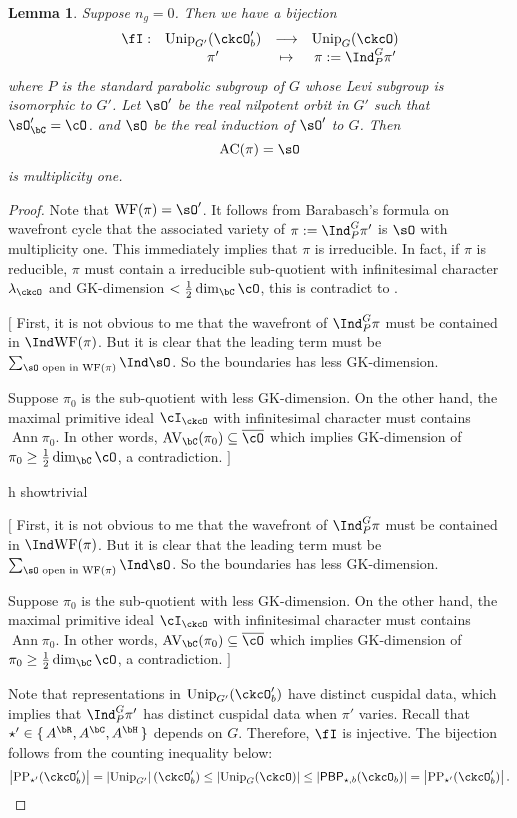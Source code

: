\documentclass[12pt,a4paper]{amsart}
\newcommand{\trivial}[2][]{\if\relax\detokenize{#1}\relax
  {%
      \color{orange} \vspace{0em} $[$  #2 $]$
      \color{black}
  }
  \else
\ifx#1h
\ifcsname showtrivial\endcsname
{%
    \color{orange} \vspace{0em}  $[$ #2 $]$
    \color{black}
}
\fi
\else {\red Wrong argument!} \fi
\fi
}
\newcommand{\AC}{\mathrm{AC}}
\newcommand{\WF}{\mathrm{WF}}
\newcommand{\AV}{\mathrm{AV}}
\def\abs#1{\left|{#1}\right|}
\DeclareMathOperator{\Ann}{Ann}
\numberwithin{equation}{section}
\newtheorem{lem}[thm]{Lemma}
\theoremstyle{remark}
\def\half{{\tfrac{1}{2}}}
\def\Unip{\mathrm{Unip}}
\def\lamck{\lambda_\ckcO}
\def\PP{\mathrm{PP}}
\def\PBP{\mathsf{PBP}}
\begin{document}
\begin{lem}
  Suppose $n_{g}=0$. Then we have a bijection
  \[
    \begin{array}{rccc}
      \fI: &\Unip_{G'}(\ckcO'_{b}) & \longrightarrow & \Unip_{G}(\ckcO) \\
      &\pi' & \mapsto & \pi:=\Ind_{P}^{G}\pi'
    \end{array}
  \]
  where $P$ is the standard parabolic subgroup of $G$ whose Levi subgroup is
  isomorphic to $G'$.
  Let $\sO'$ be the real nilpotent orbit in $G'$ such that $\sO'_{\bC}=\cO$.
  and $\sO$ be the real induction of $\sO'$ to $G$.
  Then
  \[
    \AC(\pi) = \sO
  \]
  is multiplicity one.
\end{lem}
\begin{proof}
  Note that $\WF(\pi)=\sO'$.
  It follows from Barabasch's formula on wavefront cycle that the
  associated variety of $\pi:=\Ind_{P}^{G}\pi'$ is $\sO$ with multiplicity one.
  This immediately implies that $\pi$ is irreducible. In fact, if $\pi$ is
  reducible, $\pi$ must contain a irreducible sub-quotient with infinitesimal
  character $\lambda_{\ckcO}$ and GK-dimension $<\half\dim_{\bC}\cO$, this
  is contradict to .
  \trivial[]{
    First, it is not obvious to me that the wavefront of $\Ind_{P}^{G}\pi$
    must be contained in $\Ind\WF(\pi)$. But it is clear that the leading term
    must be $\sum_{\sO\text{ open in } \WF(\pi)}\Ind\sO$. So the boundaries has
    less GK-dimension.

    Suppose $\pi_{0}$ is the sub-quotient with less GK-dimension.
    On the other hand, the maximal primitive ideal $\cI_{\ckcO}$  with infinitesimal
    character must contains $\Ann\pi_{0}$. In other words,
    $\AV_{\bC}(\pi_{0})\subseteq \bcO$ which implies GK-dimension of
    $\pi_{0}\geq \half\dim_{\bC}\cO$, a contradiction.
  }
  Note that representations in $\Unip_{G'}(\ckcO'_{b})$ have distinct
  cuspidal data, which implies that $\Ind_{P}^{G}\pi'$ has distinct cuspidal
  data when $\pi'$ varies.
  Recall that $\star' \in \set{A^{\bR},A^{\bC}, A^{\bH}}$ depends on $G$.
  Therefore, $\fI$ is injective. The bijection follows from the counting
  inequality below:
  \[
    \abs{\PP_{\star'}(\ckcO'_{b})}=\abs{\Unip_{G'}}(\ckcO'_{b})\leq \abs{\Unip_{G}(\ckcO)}
    \leq \abs{\PBP_{\star,b}(\ckcO_{b})} = \abs{\PP_{\star'}(\ckcO'_{b})}.
  \]
\end{proof}
\end{document}
